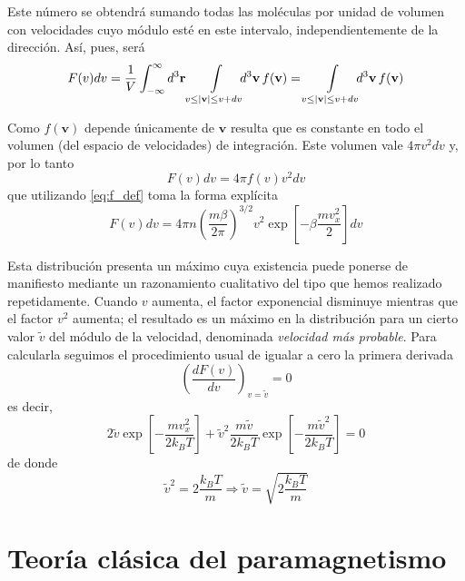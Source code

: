 Este número se obtendrá sumando todas las moléculas por unidad de volumen con velocidades cuyo módulo esté en este intervalo, independientemente de la dirección.
Así, pues, será
\begin{equation}
	F(v)dv = \frac{1}{V} \int_{-\infty}^{\infty} d^3\mathbf{r} \int\limits_{v \le | \mathbf{v} | \le v+dv} \mkern-10mu d^3\mathbf{v} \, f(\mathbf{v}) = \int\limits_{v \le | \mathbf{v} | \le v+dv} \mkern-10mu d^3\mathbf{v} \, f(\mathbf{v})
\end{equation}

Como $f(\mathbf{v})$ depende únicamente de $\mathbf{v}$ resulta que es constante en todo el volumen (del espacio de velocidades) de integración. Este volumen vale $4\pi v^2 dv$ y, por lo tanto
\begin{equation}
	F(v)dv = 4\pi f(v) v^2 dv
\end{equation}
que utilizando \eqref{eq:f_def} toma la forma explícita
\begin{equation}
	F(v)dv = 4\pi n \left( \frac{m\beta}{2\pi} \right) ^{3/2}  v^2 \exp \left[ -\beta\frac{mv_x^2}{2} \right] dv
\end{equation}

Esta distribución presenta un máximo cuya existencia puede ponerse de manifiesto mediante un razonamiento cualitativo del tipo que hemos realizado repetidamente.
Cuando $v$ aumenta, el factor exponencial disminuye mientras que el factor $v^2$ aumenta; el resultado es un máximo en la distribución para un cierto valor $\widetilde{v}$ del módulo de la velocidad, denominada \emph{velocidad más probable}.
Para calcularla seguimos el procedimiento usual de igualar a cero la primera derivada
\begin{equation*}
	\left( \frac{d F(v)}{dv} \right)_{v=\widetilde{v}} = 0
\end{equation*}
es decir,
\begin{equation}
	2\widetilde{v} \exp \left[ -\frac{mv_x^2}{2 k_B T} \right] +\widetilde{v}^2 \frac{m\widetilde{v}}{2 k_B T} \exp \left[ -\frac{m\widetilde{v}^2}{2 k_B T} \right] = 0
\end{equation}
de donde
\begin{equation}
	\widetilde{v}^2 = 2\frac{k_B T}{m} \Rightarrow \widetilde{v} = \sqrt{2\frac{k_B T}{m}}
\end{equation}

\section{Teoría clásica del paramagnetismo}

